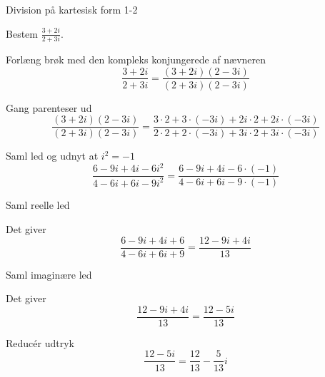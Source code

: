 \documentclass{article}
\begin{document}
\begin{exercise}{Division på kartesisk form 1-2}
	
	Bestem $\frac{3+2i}{2+3i}$.
	
	
	
	\hint 
	
	Forlæng brøk med den kompleks konjungerede af nævneren
	\[
	\frac{3+2i}{2+3i} = \frac{(3+2i)(2-3i)}{(2+3i)(2-3i)}
	\]
	
	\hint
	
	Gang parenteser ud
	\[
	\frac{(3+2i)(2-3i)}{(2+3i)(2-3i)} = \frac{3 \cdot 2 + 3 \cdot (-3i) + 2i \cdot 2 + 2i \cdot (-3i)}{2 \cdot 2 + 2\cdot (-3i) + 3i \cdot 2 + 3i \cdot (-3i)}
	\]
	
	\hint 
	
	Saml led og udnyt at $i^2 = -1$
	\[
	\frac{6 -9i +4i-6i^2}{4 - 6i + 6i -9i^2} = 	\frac{6 -9i +4i-6 \cdot (-1)}{4 - 6i + 6i -9 \cdot (-1)}
	\]
	
	\hint
	
	Saml reelle led
	
	\hint
	
	Det giver
	\[
	\frac{6 -9i +4i+6}{4 - 6i + 6i +9} = \frac{12 - 9i +4i}{13}
	\]
	
	\hint
	
	Saml imaginære led
	
	
	\hint
	
	Det giver 
	\[
	\frac{12 - 9i +4i}{13} = \frac{12 -5i}{13}
	\]
	
	\hint
	
	Reducér udtryk
	\[
	 \frac{12 -5i}{13} = \frac{12}{13} - \frac{5}{13}i
	\]
	
\end{exercise}

\newpage
\end{document}
